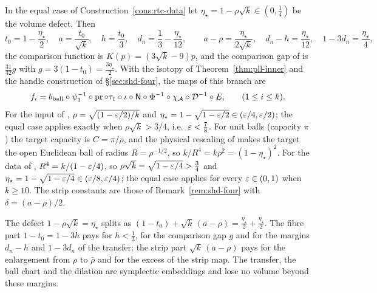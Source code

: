 \begin{remark}\label{rem:rtc-equal}\label{rem:cub-lean}
In the equal case of Construction~\ref{cons:rtc-data} let $\eta_\star=1-\rho\sqrt k\in(0,\frac14)$ be the volume defect. Then
\[
 t_0=1-\frac{\eta_\star}2,\quad a=\frac{t_0}{\sqrt k},\quad h=\frac{t_0}3,\quad d_n=\frac13-\frac{\eta_\star}{12},\qquad
 a-\rho=\frac{\eta_\star}{2\sqrt k},\quad d_n-h=\frac{\eta_\star}{12},\quad 1-3d_n=\frac{\eta_\star}4,
\]
the comparison function is $K(p)=(3\sqrt k-9)p$, and the comparison gap of  is
$\frac{31}{32}g$ with $g=3(1-t_0)=\frac{3\eta_\star}2$. With the isotopy of Theorem~\ref{thm:pll-inner} and the handle
construction of \S\ref{sec:shd-four}, the maps of this branch are
\[
 f_i= b_{\rm ball}\circ\psi_1^{-1}\circ\operatorname{pr}\circ\tau_1\circ\iota
       \circ\mathsf N\circ\Phi^{-1}\circ\chi_{\mathcal A}\circ\mathcal D^{-1}\circ E_i\qquad(1\le i\le k).
\]
For the input of , $\rho=\sqrt{(1-\varepsilon/2)/k}$ and
$\eta_\star=1-\sqrt{1-\varepsilon/2}\in(\varepsilon/4,\varepsilon/2)$; the equal case applies exactly when $\rho\sqrt k>3/4$, i.e.\ $\varepsilon<\frac78$.
For unit balls (capacity $\pi$) the target capacity is $C=\pi/\rho$, and the
physical rescaling of  makes the target the open Euclidean ball of radius
$R=\rho^{-1/2}$, so $k/R^4=k\rho^2=(1-\eta_\star)^2$. For the data of , $R^4=k/(1-\varepsilon/4)$, so
$\rho\sqrt k=\sqrt{1-\varepsilon/4}>\frac34$ and $\eta_\star=1-\sqrt{1-\varepsilon/4}\in(\varepsilon/8,\varepsilon/4)$; the equal case applies
for every $\varepsilon\in(0,1)$ when $k\ge10$. The strip constants are those of Remark~\ref{rem:shd-four} with
$\delta=(a-\rho)/2$.

The defect $1-\rho\sqrt k=\eta_\star$ splits as $(1-t_0)+\sqrt k\,(a-\rho)=\frac{\eta_\star}2+\frac{\eta_\star}2$. The fibre part $1-t_0=1-3h$ pays for
$h<\frac13$, for the comparison gap $g$ and for the margins $d_n-h$ and $1-3d_n$ of the transfer; the strip part $\sqrt k\,(a-\rho)$ pays for the enlargement from $\rho$ to $\bar\rho$ and for the excess of the strip map.
The transfer, the ball chart and the dilation are symplectic embeddings and lose no volume beyond these margins.
\end{remark}

